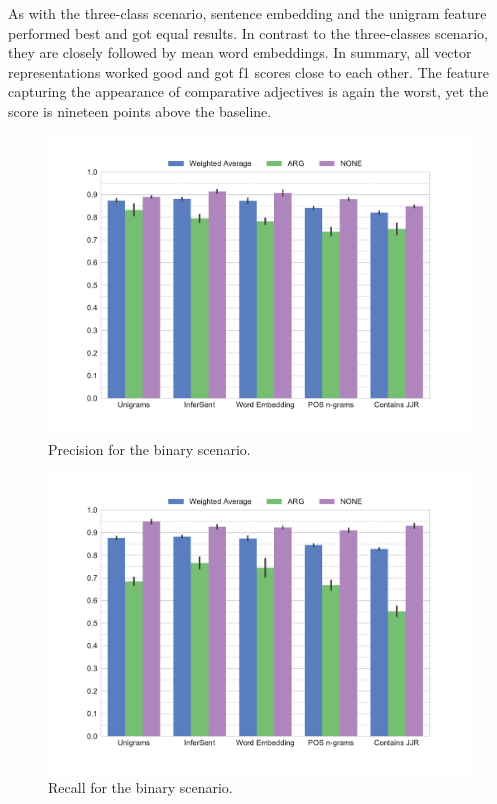 As with the three-class scenario, sentence embedding and the unigram feature performed best and got equal results. In contrast to the three-classes scenario, they are closely followed by mean word embeddings. In summary, all vector representations worked good and got f1 scores close to each other. The feature capturing the appearance of comparative adjectives is again the worst, yet the score is nineteen points above the baseline.

\begin{figure}[ht]

   \caption{Precision for the binary scenario.} 
    \label{fig:2_precision}
    \centering
	\includegraphics[width=1\linewidth]{images/experiments/precision-True}
    \end{figure}
    
    \begin{figure}[hb]
     \caption{Recall for the binary scenario.} 
       \label{fig:2_recall}
 \centering
	\includegraphics[width=1\linewidth]{images/experiments/recall-True}

\end{figure}

